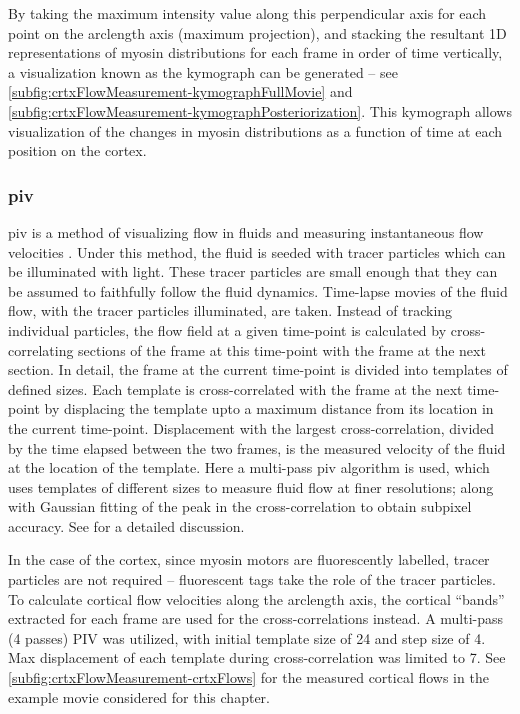 By taking the maximum intensity value along this perpendicular axis for each point on the arclength axis (maximum projection), and stacking the resultant 1D representations of myosin distributions for each frame in order of time vertically, a visualization known as the kymograph can be generated -- see \autoref{subfig:crtxFlowMeasurement-kymographFullMovie} and \autoref{subfig:crtxFlowMeasurement-kymographPosteriorization}. This kymograph allows visualization of the changes in myosin distributions as a function of time at each position on the cortex.

\subsubsection{\acf{piv}}\label{subsubsec:pivCortex}
\ac{piv} is a method of visualizing flow in fluids and measuring instantaneous flow velocities \citep{raffel1998particle,thielicke2014pivlab}. Under this method, the fluid is seeded with tracer particles which can be illuminated with light. These tracer particles are small enough that they can be assumed to faithfully follow the fluid dynamics. Time-lapse movies of the fluid flow, with the tracer particles illuminated, are taken. Instead of tracking individual particles, the flow field at a given time-point is calculated by cross-correlating sections of the frame at this time-point with the frame at the next section. In detail, the frame at the current time-point is divided into templates of defined sizes. Each template is cross-correlated with the frame at the next time-point by displacing the template upto a maximum distance from its location in the current time-point. Displacement with the largest cross-correlation, divided by the time elapsed between the two frames, is the measured velocity of the fluid at the location of the template. Here a multi-pass \ac{piv} algorithm is used, which uses templates of different sizes to measure fluid flow at finer resolutions; along with Gaussian fitting of the peak in the cross-correlation to obtain subpixel accuracy. See \cite{raffel1998particle} for a detailed discussion. 

In the case of the cortex, since myosin motors are fluorescently labelled, tracer particles are not required -- fluorescent tags take the role of the tracer particles. To calculate cortical flow velocities along the arclength axis, the cortical \enquote{bands} extracted for each frame are used for the cross-correlations instead. A multi-pass (4 passes) PIV was utilized, with initial template size of \SI{24}{\pixels} and step size of \SI{4}{\pixels}. Max displacement of each template during cross-correlation was limited to \SI{7}{\pixels}. See \autoref{subfig:crtxFlowMeasurement-crtxFlows} for the measured cortical flows in the example movie considered for this chapter.

